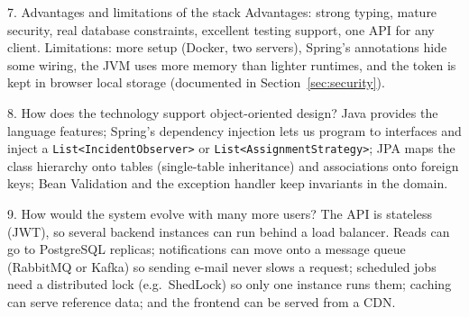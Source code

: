 \documentclass[11pt,a4paper]{article}
\begin{document}
\begin{keybox}{7. Advantages and limitations of the stack}
Advantages: strong typing, mature security, real database constraints, excellent testing support, one API for any client. Limitations: more setup (Docker, two servers), Spring's annotations hide some wiring, the JVM uses more memory than lighter runtimes, and the token is kept in browser local storage (documented in Section~\ref{sec:security}).
\end{keybox}
\begin{keybox}{8. How does the technology support object-oriented design?}
Java provides the language features; Spring's dependency injection lets us program to interfaces and inject a \texttt{List<IncidentObserver>} or \texttt{List<AssignmentStrategy>}; JPA maps the class hierarchy onto tables (single-table inheritance) and associations onto foreign keys; Bean Validation and the exception handler keep invariants in the domain.
\end{keybox}
\begin{keybox}{9. How would the system evolve with many more users?}
The API is stateless (JWT), so several backend instances can run behind a load balancer. Reads can go to PostgreSQL replicas; notifications can move onto a message queue (RabbitMQ or Kafka) so sending e-mail never slows a request; scheduled jobs need a distributed lock (e.g.\ ShedLock) so only one instance runs them; caching can serve reference data; and the frontend can be served from a CDN.
\end{keybox}

\end{document}
